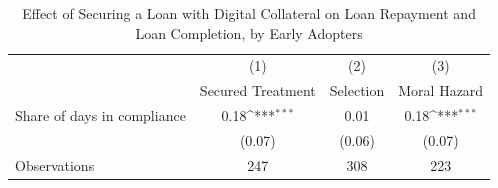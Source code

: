 \begin{table}[htbp]\centering
\def\sym#1{\ifmmode^{#1}\else\(^{#1}\)\fi}
\caption{Effect of Securing a Loan with Digital Collateral on Loan Repayment and Loan Completion, by Early Adopters\label{LASMH\_repay\_earlyadopt\_LATE\_100}}
\begin{tabular}{l*{3}{c}}
\toprule
                    &\multicolumn{1}{c}{(1)}&\multicolumn{1}{c}{(2)}&\multicolumn{1}{c}{(3)}\\
                    &\multicolumn{1}{c}{Secured Treatment}&\multicolumn{1}{c}{Selection}&\multicolumn{1}{c}{Moral Hazard}\\
\midrule
Share of days in compliance&        0.18\sym{***}&        0.01         &        0.18\sym{***}\\
                    &      (0.07)         &      (0.06)         &      (0.07)         \\
\midrule
Observations        &         247         &         308         &         223         \\
\bottomrule
\end{tabular}
\end{table}
